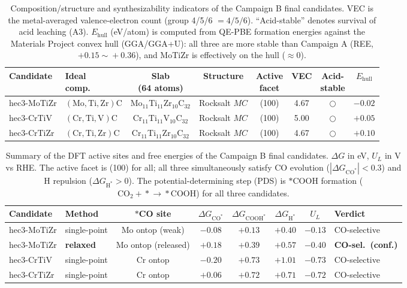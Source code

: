 \documentclass[11pt,a4paper]{report}
\newcommand{\dGCO}{\Delta G_{\mathrm{CO^*}}}
\newcommand{\dGH}{\Delta G_{\mathrm{H^*}}}
\newcommand{\dGCOOH}{\Delta G_{\mathrm{COOH^*}}}
\begin{document}
\begin{table}[t]
\centering
\caption{Composition/structure and synthesizability indicators of the Campaign B final candidates. VEC is the metal-averaged valence-electron count (group 4/5/6
$=4/5/6$). ``Acid-stable'' denotes survival of acid leaching (A3). $E_{\mathrm{hull}}$ (eV/atom) is computed from
QE-PBE formation energies against the Materials Project convex hull (GGA/GGA+U): all three are more stable than
Campaign A (REE, $+0.15\!\sim\!+0.36$), and MoTiZr is effectively on the hull ($\approx\!0$).}
\label{tab:comp}
\setlength{\tabcolsep}{3pt}\footnotesize
\begin{tabular}{llcccccc}
\hline
Candidate & \shortstack{Ideal\\comp.} & \shortstack{Slab\\(64 atoms)} & Structure & \shortstack{Active\\facet} & VEC & \shortstack{Acid-\\stable} & $E_{\mathrm{hull}}$ \\
\hline
hec3-MoTiZr & $(\mathrm{Mo,Ti,Zr})\mathrm{C}$ & Mo$_{11}$Ti$_{11}$Zr$_{10}$C$_{32}$ & Rocksalt $MC$ & (100) & 4.67 & $\bigcirc$ & $-0.02$ \\
hec3-CrTiV  & $(\mathrm{Cr,Ti,V})\mathrm{C}$  & Cr$_{11}$Ti$_{11}$V$_{10}$C$_{32}$  & Rocksalt $MC$ & (100) & 5.00 & $\bigcirc$ & $+0.05$ \\
hec3-CrTiZr & $(\mathrm{Cr,Ti,Zr})\mathrm{C}$ & Cr$_{11}$Ti$_{11}$Zr$_{10}$C$_{32}$ & Rocksalt $MC$ & (100) & 4.67 & $\bigcirc$ & $+0.10$ \\
\hline
\end{tabular}
\end{table}

\begin{table}[t]
\centering
\caption{Summary of the DFT active sites and free energies of the Campaign B final candidates. $\Delta G$ in eV, $U_L$ in V vs RHE.
The active facet is (100) for all; all three simultaneously satisfy CO evolution ($|\dGCO|<0.3$) and H repulsion ($\dGH>0$). The potential-determining
step (PDS) is $*$COOH formation ($\mathrm{CO_2}\!+\!*\!\to\!{*}\mathrm{COOH}$) for all three candidates.}
\label{tab:dual}
\footnotesize\setlength{\tabcolsep}{4pt}
\begin{tabular}{llcccccl}
\hline
Candidate & Method & $*$CO site & $\dGCO$ & $\dGCOOH$ & $\dGH$ & $U_L$ & Verdict \\
\hline
hec3-MoTiZr & single-point & Mo ontop (weak) & $-0.08$ & $+0.13$ & $+0.40$ & $-0.13$ & CO-selective \\
hec3-MoTiZr & \textbf{relaxed} & Mo ontop (released) & $+0.18$ & $+0.39$ & $+0.57$ & $-0.40$ & \textbf{CO-sel.\ (conf.)} \\
hec3-CrTiV  & single-point & Cr ontop & $-0.20$ & $+0.73$ & $+1.01$ & $-0.73$ & CO-selective \\
hec3-CrTiZr & single-point & Cr ontop & $+0.06$ & $+0.72$ & $+0.71$ & $-0.72$ & CO-selective \\
\hline
\end{tabular}
\end{table}
\end{document}
